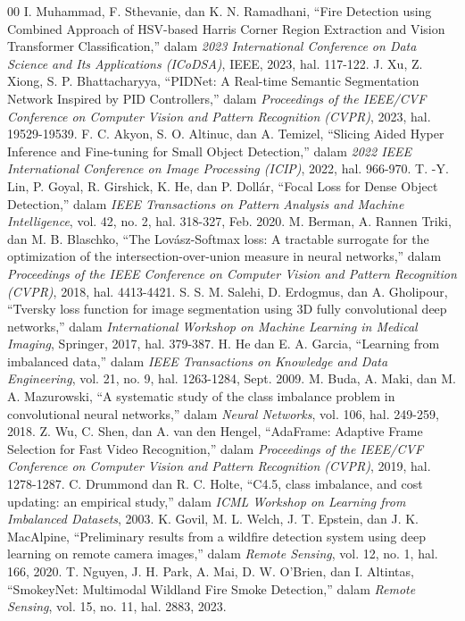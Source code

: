 \documentclass[conference]{IEEEtran}
\begin{document}
\begin{thebibliography}{00}
 I. Muhammad, F. Sthevanie, dan K. N. Ramadhani, ``Fire Detection using Combined Approach of HSV-based Harris Corner Region Extraction and Vision Transformer Classification,'' dalam \textit{2023 International Conference on Data Science and Its Applications (ICoDSA)}, IEEE, 2023, hal. 117-122.
 J. Xu, Z. Xiong, S. P. Bhattacharyya, ``PIDNet: A Real-time Semantic Segmentation Network Inspired by PID Controllers,'' dalam \textit{Proceedings of the IEEE/CVF Conference on Computer Vision and Pattern Recognition (CVPR)}, 2023, hal. 19529-19539.
 F. C. Akyon, S. O. Altinuc, dan A. Temizel, ``Slicing Aided Hyper Inference and Fine-tuning for Small Object Detection,'' dalam \textit{2022 IEEE International Conference on Image Processing (ICIP)}, 2022, hal. 966-970.
 T. -Y. Lin, P. Goyal, R. Girshick, K. He, dan P. Dollár, ``Focal Loss for Dense Object Detection,'' dalam \textit{IEEE Transactions on Pattern Analysis and Machine Intelligence}, vol. 42, no. 2, hal. 318-327, Feb. 2020.
 M. Berman, A. Rannen Triki, dan M. B. Blaschko, ``The Lovász-Softmax loss: A tractable surrogate for the optimization of the intersection-over-union measure in neural networks,'' dalam \textit{Proceedings of the IEEE Conference on Computer Vision and Pattern Recognition (CVPR)}, 2018, hal. 4413-4421.
 S. S. M. Salehi, D. Erdogmus, dan A. Gholipour, ``Tversky loss function for image segmentation using 3D fully convolutional deep networks,'' dalam \textit{International Workshop on Machine Learning in Medical Imaging}, Springer, 2017, hal. 379-387.
 H. He dan E. A. Garcia, ``Learning from imbalanced data,'' dalam \textit{IEEE Transactions on Knowledge and Data Engineering}, vol. 21, no. 9, hal. 1263-1284, Sept. 2009.
 M. Buda, A. Maki, dan M. A. Mazurowski, ``A systematic study of the class imbalance problem in convolutional neural networks,'' dalam \textit{Neural Networks}, vol. 106, hal. 249-259, 2018.
 Z. Wu, C. Shen, dan A. van den Hengel, ``AdaFrame: Adaptive Frame Selection for Fast Video Recognition,'' dalam \textit{Proceedings of the IEEE/CVF Conference on Computer Vision and Pattern Recognition (CVPR)}, 2019, hal. 1278-1287.
 C. Drummond dan R. C. Holte, ``C4.5, class imbalance, and cost updating: an empirical study,'' dalam \textit{ICML Workshop on Learning from Imbalanced Datasets}, 2003.
 K. Govil, M. L. Welch, J. T. Epstein, dan J. K. MacAlpine, ``Preliminary results from a wildfire detection system using deep learning on remote camera images,'' dalam \textit{Remote Sensing}, vol. 12, no. 1, hal. 166, 2020.
 T. Nguyen, J. H. Park, A. Mai, D. W. O'Brien, dan I. Altintas, ``SmokeyNet: Multimodal Wildland Fire Smoke Detection,'' dalam \textit{Remote Sensing}, vol. 15, no. 11, hal. 2883, 2023.
\end{thebibliography}
\end{document}
